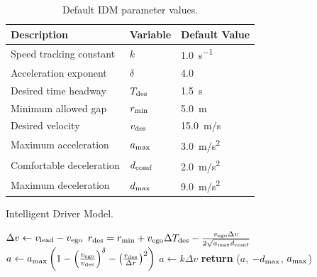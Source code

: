 \begin{table}
    \centering
    \caption{Default IDM parameter values.}
    \label{tab:idm_params}
    \begin{tabular}{@{}lll@{}} 
        \toprule
        \textbf{Description} & \textbf{Variable} & \textbf{Default Value} \\
        \midrule
        Speed tracking constant & $k$ & \SI{1.0}{s^{-1}} \\
        Acceleration exponent & $\delta$ & \num{4.0} \\
        Desired time headway & $T_{\rm des}$ & \SI{1.5}{s}\\
        Minimum allowed gap & $r_{\rm min}$ & \SI{5.0}{m} \\
        Desired velocity & $v_{\rm des}$ & \SI{15.0}{m/s} \\
        Maximum acceleration & $a_{\rm max}$ & \SI{3.0}{m/s^2} \\
        Comfortable deceleration & $d_{\rm comf}$ & \SI{2.0}{m/s^2} \\
        Maximum deceleration & $d_{\rm max}$ & \SI{9.0}{m/s^2} \\
        \bottomrule
    \end{tabular}
\end{table}


 \begin{algorithm}
\caption{Intelligent Driver Model.}
    \label{alg:idm}
\begin{algorithmic}[1]
    \State $\Delta v \gets v_{\rm lead} - v_{\rm ego}$
     \label{line:idm_has_lead}
        \State $r_{\rm des} = r_{\rm min} + v_{\rm ego} \Delta T_{\rm des} - \frac{v_{\rm ego} \Delta v}{2 \sqrt{a_{\rm max} d_{\rm comf}}}$ \label{line:idm_compute_desired}
        \State $a \gets a_{\rm max} \left( 1 - \left(\frac{v_{\rm ego}}{v_{\rm des}} \right)^{\delta} - \left( \frac{r _{\rm des}}{\Delta r} \right)^2 \right)$ \label{line:idm_compute_acc}
    \Else \label{line:idm_nolead}
        \State $a \gets k \Delta v$ \label{line:idm_compute_acc_free}
    \EndIf
    \State \textbf{return} ($a$, $-d_{\rm max}$, $a_{\rm max}$) \label{line:idm_clamp_acc}
    \EndFunction
\end{algorithmic}
\end{algorithm}


